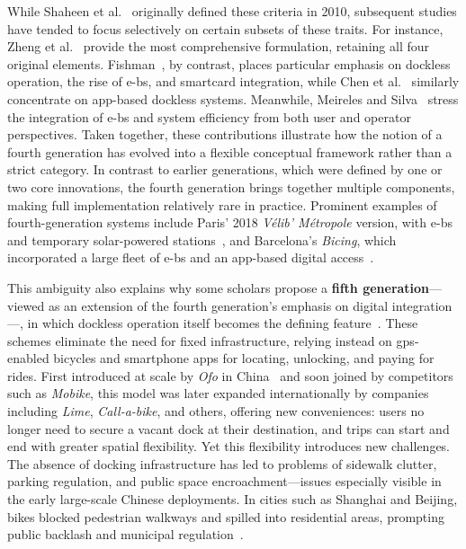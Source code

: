 While Shaheen et al.~\cite{Shaheen2010} originally defined these criteria in 2010, subsequent studies have tended to focus selectively on certain subsets of these traits. For instance, Zheng et al.~\cite{Zheng2020} provide the most comprehensive formulation, retaining all four original elements. Fishman~\cite{Fishman2016}, by contrast, places particular emphasis on dockless operation, the rise of \acp{e-b}, and smartcard integration, while Chen et al.~\cite{Chen2020} similarly concentrate on app-based dockless systems. Meanwhile, Meireles and Silva~\cite{Meireles2013} stress the integration of \acp{e-b} and system efficiency from both user and operator perspectives. Taken together, these contributions illustrate how the notion of a fourth generation has evolved into a flexible conceptual framework rather than a strict category. In contrast to earlier generations, which were defined by one or two core innovations, the fourth generation brings together multiple components, making full implementation relatively rare in practice. Prominent examples of fourth-generation systems include Paris' 2018 \textit{Vélib’ Métropole} version, with \acp{e-b} and temporary solar-powered stations~\cite{Garrigues2017}, and Barcelona’s \textit{Bicing}, which incorporated a large fleet of \acp{e-b} and an app-based digital access~\cite{Bicing2025}.

This ambiguity also explains why some scholars propose a \textbf{fifth generation}—viewed as an extension of the fourth generation’s emphasis on digital integration—, in which dockless operation itself becomes the defining feature~\cite{Xu2024, Vallez2021, Guidon2019, Chen2018}. These schemes eliminate the need for fixed infrastructure, relying instead on \ac{gps}-enabled bicycles and smartphone apps for locating, unlocking, and paying for rides. First introduced at scale by \textit{Ofo} in China~\cite{Zhang2018} and soon joined by competitors such as \textit{Mobike}, this model was later expanded internationally by companies including \textit{Lime}, \textit{Call-a-bike}, and others, offering new conveniences: users no longer need to secure a vacant dock at their destination, and trips can start and end with greater spatial flexibility. Yet this flexibility introduces new challenges. The absence of docking infrastructure has led to problems of sidewalk clutter, parking regulation, and public space encroachment—issues especially visible in the early large-scale Chinese deployments. In cities such as Shanghai and Beijing, bikes blocked pedestrian walkways and spilled into residential areas, prompting public backlash and municipal regulation~\cite{Wang2019}.

